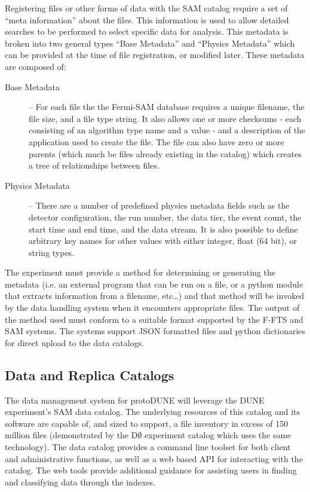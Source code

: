 \documentclass[12pt]{article}
\newcommand{\pd}{protoDUNE\xspace}
\begin{document}
Registering files or other forms of data with the SAM catalog require a set of ``meta information'' about the files.  This information is used to allow detailed searches to be performed to select specific data for analysis.  This metadata is broken into two general types ``Base Metadata'' and ``Physics Metadata'' which can be provided at the time of file registration, or modified later.  These metadata are composed of:
\begin{description}
\item[Base Metadata] -- For each file the the Fermi-SAM database requires a unique filename, the file size, and a file type string. It also allows one or more checksums - each consisting of an algorithm type name and a value - and a description of the application used to create the file. The file can also have zero or more parents (which much be files already existing in the catalog) which creates a tree of relationships between files.
\item[Physics Metadata] -- There are a number of predefined physics metadata fields such as the detector configuration, the run number, the data tier, the event count, the start time and end time, and the data stream. It is also possible to define arbitrary key names for other values with either integer, float (64 bit), or string types.
\end{description}

\noindent
The experiment must provide a method for determining or generating the metadata (i.e. an external program that can be run on a file, or a python module that extracts information from a filename, etc…)  and that method will be invoked by the data handling system when it encounters appropriate files.  The output of the method used must conform to a suitable format supported by the F-FTS and SAM systems.  The systems support JSON formatted files and python dictionaries for direct upload to the data catalogs.  

\subsection{Data and Replica Catalogs}

The data management system for \pd will leverage the DUNE experiment’s SAM data catalog.
 The underlying resources of this catalog and its software are capable of, and sized to support,
a file inventory in excess of 150 million files (demonstrated by the D$\emptyset$ experiment catalog which
uses the same technology).  The data catalog provides a command line toolset for both client and
administrative functions, as well as a web based API for interacting with the catalog.  The web tools
provide additional guidance for assisting users in finding and classifying data through the indexes.
\end{document}
